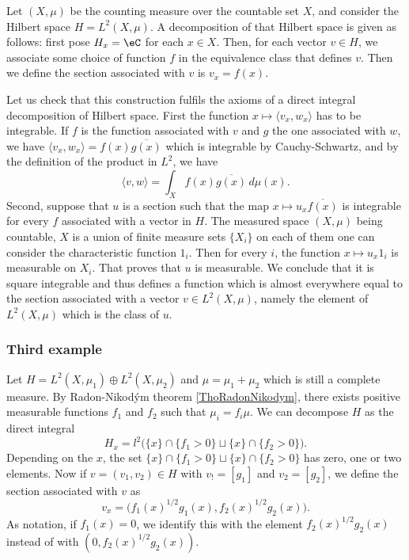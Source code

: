 Let $(X,\mu)$ be the counting measure over the countable set $X$, and consider the Hilbert space $H=L^2(X,\mu)$. A decomposition of that Hilbert space is given as follows: first pose $H_x=\eC$ for each $x\in X$. Then, for each vector $v\in H$, we associate some choice of function $f$ in the equivalence class that defines $v$. Then we define the section associated with $v$ is $v_x=f(x)$.

Let us check that this construction fulfils the axioms of a direct integral decomposition of Hilbert space. First the function $x\mapsto \langle v_x, w_x\rangle $ has to be integrable. If $f$ is the function associated with $v$ and $g$ the one associated with $w$, we have $\langle v_x, w_x\rangle =f(x)\overline{ g(x) }$ which is integrable by Cauchy-Schwartz, and by the definition of the product in $L^2$, we have
\begin{equation}
	\langle v, w\rangle =\int_X f(x)\overline{ g(x) }\,d\mu(x).
\end{equation}
Second, suppose that $u$ is a section such that the map $x\mapsto u_x\overline{ f(x) }$ is integrable for every $f$ associated with a vector in $H$. The measured space $(X,\mu)$ being countable, $X$ is a union of finite measure sets $\{ X_i \}$ on each of them one can consider the characteristic function $1_i$. Then for every $i$, the function $x\mapsto u_x 1_i$ is measurable on $X_i$. That proves that $u$ is measurable. We conclude that it is square integrable and thus defines a function which is almost everywhere equal to the section associated with a vector $v\in L^2(X,\mu)$, namely the element of $L^2(X,\mu)$ which is the class of $u$.

					\subsubsection{Third example}

Let $H=L^2(X,\mu_1)\oplus L^2(X,\mu_2)$ and $\mu=\mu_1+\mu_2$ which is still a complete measure. By Radon-Nikod\'ym theorem \ref{ThoRadonNikodym}, there exists positive measurable functions $f_1$ and $f_2$ such that $\mu_i=f_i\mu$. We can decompose $H$ as the direct integral
\begin{equation}
	H_x=l^2\Big(    \{ x \}\cap\{ f_1>0 \}\sqcup \{ x \}\cap\{ f_2>0 \}  \Big).
\end{equation}
Depending on the $x$, the set $\{ x \}\cap\{ f_1>0 \}\sqcup \{ x \}\cap\{ f_2>0 \}$ has zero, one or two elements. Now if $v=(v_1,v_2)\in H$ with $v_!=[g_1]$ and $v_2=[g_2]$, we define the section associated with $v$ as
\begin{equation}
	v_x=\big( f_1(x)^{1/2}g_1(x),f_2(x)^{1/2}g_2(x) \big).
\end{equation}
As notation, if $f_1(x)=0$, we identify this with the element $f_2(x)^{1/2}g_2(x)$ instead of with $(0,f_2(x)^{1/2}g_2(x))$.

